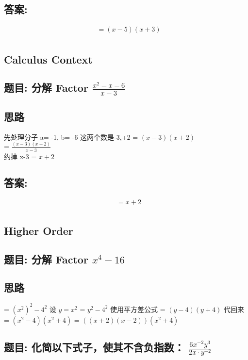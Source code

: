 \documentclass[12pt]{article}
\begin{document}
\subsection*{答案:}
\begin{align*}
  &= (x-5)(x+3) \\
\end{align*}

\subsection*{Calculus Context}
\subsection*{题目: 分解 Factor $\frac{x^{2}-x-6}{x-3}$}

\subsection*{思路}
先处理分子 a= -1, b= -6
这两个数是-3,+2
= $(x-3)(x+2)$\\
= $\frac{(x-3)(x+2)}{x-3}$\\
约掉 x-3
= $x+2$\\

\subsection*{答案:}
\begin{align*}
  &= x+2 \\
\end{align*}

\subsection*{Higher Order}
\subsection*{题目: 分解 Factor $x^{4}-16$}
\subsection*{思路}
= $(x^{2})^{2} - 4^{2}$
设 $y=x^{2}$ 
= $y^{2} - 4^{2}$
使用平方差公式
= $(y-4)(y+4)$
代回来
= $(x^{2}-4)(x^{2} + 4)$ 
= $((x+2)(x-2))(x^{2} + 4) $

\subsection*{题目: 化简以下式子，使其不含负指数： $\frac{6x^{-2}y^{3}}{2x \cdot y^{-2}}$}
\end{document}
